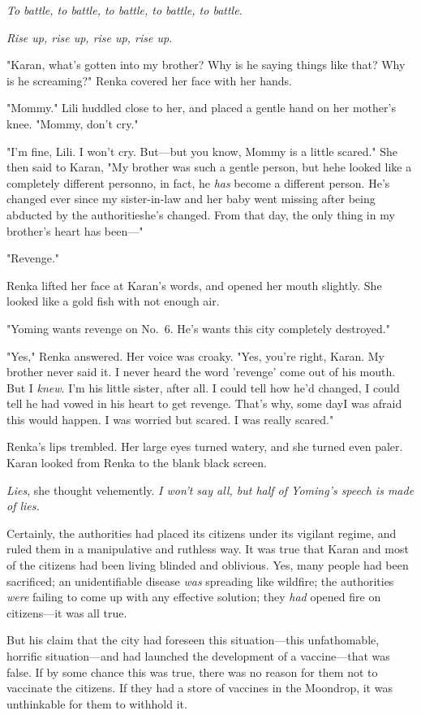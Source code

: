 \emph{To battle, to battle, to battle, to battle, to battle.}

\emph{Rise up, rise up, rise up, rise up.}

"Karan, what's gotten into my brother? Why is he saying things like
that? Why is he screaming?" Renka covered her face with her hands.

"Mommy." Lili huddled close to her, and placed a gentle hand on her
mother's knee. "Mommy, don't cry."

"I'm fine, Lili. I won't cry. But---but you know, Mommy is a little
scared." She then said to Karan, "My brother was such a gentle person,
but he\el he looked like a completely different person\el no, in fact,
he \emph{has} become a different person. He's changed ever since my
sister-in-law and her baby went missing after being abducted by the
authorities\el he's changed. From that day, the only thing in my
brother's heart has been---"

"Revenge."

Renka lifted her face at Karan's words, and opened her mouth slightly.
She looked like a gold fish with not enough air.

"Yoming wants revenge on No.~6. He's wants this city completely
destroyed."

"Yes," Renka answered. Her voice was croaky. "Yes, you're right, Karan.
My brother never said it. I never heard the word 'revenge' come out of
his mouth. But I \emph{knew}. I'm his little sister, after all. I could tell
how he'd changed, I could tell he had vowed in his heart to get revenge.
That's why, some day\el I was afraid this would happen. I was worried\el 
but scared. I was really scared."

Renka's lips trembled. Her large eyes turned watery, and she turned even
paler. Karan looked from Renka to the blank black screen.

\emph{Lies}, she thought vehemently. \emph{I won't say all, but half of Yoming's
speech is made of lies.}

Certainly, the authorities had placed its citizens under its vigilant
regime, and ruled them in a manipulative and ruthless way. It was true
that Karan and most of the citizens had been living blinded and
oblivious. Yes, many people had been sacrificed; an unidentifiable
disease \emph{was} spreading like wildfire; the authorities \emph{were} failing to
come up with any effective solution; they \emph{had} opened fire on citizens---it
was all true.

But his claim that the city had foreseen this situation---this
unfathomable, horrific situation---and had launched the development of a
vaccine---that was false. If by some chance this was true, there was no
reason for them not to vaccinate the citizens. If they had a store of
vaccines in the Moondrop, it was unthinkable for them to withhold it.

